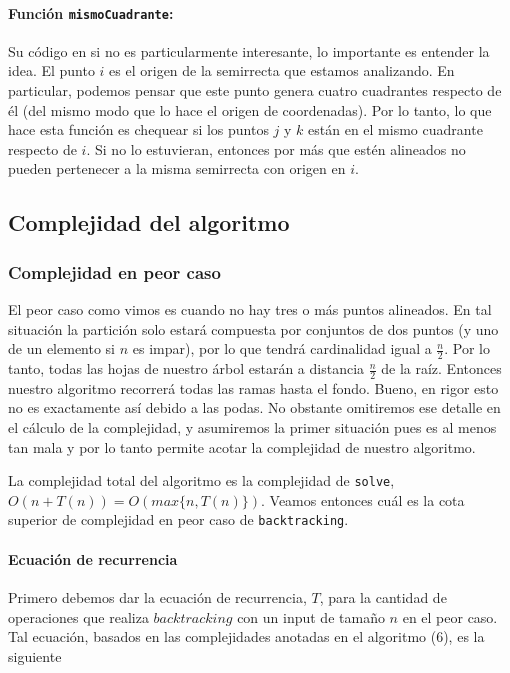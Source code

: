 
  \paragraph{Función \texttt{mismoCuadrante}:} Su código en si no es particularmente interesante, lo importante es entender la idea. El punto $i$ es el origen de la semirrecta que estamos analizando. En particular, podemos pensar que este punto genera cuatro cuadrantes respecto de él (del mismo modo que lo hace el origen de coordenadas). Por lo tanto, lo que hace esta función es chequear si los puntos $j$ y $k$ están en el mismo cuadrante respecto de $i$. Si no lo estuvieran, entonces por más que estén alineados no pueden pertenecer a la misma semirrecta con origen en $i$.

\subsection{Complejidad del algoritmo}
\subsubsection{Complejidad en peor caso}
El peor caso como vimos es cuando no hay tres o más puntos alineados. En tal situación la partición solo estará compuesta por conjuntos de dos puntos (y uno de un elemento si $n$ es impar), por lo que tendrá cardinalidad igual a $\frac{n}{2}$. Por lo tanto, todas las hojas de nuestro árbol estarán a distancia $\frac{n}{2}$ de la raíz. Entonces nuestro algoritmo recorrerá todas las ramas hasta el fondo. Bueno, en rigor esto no es exactamente así debido a las podas. No obstante omitiremos ese detalle en el cálculo de la complejidad, y asumiremos la primer situación pues es al menos tan mala y por lo tanto permite acotar la complejidad de nuestro algoritmo.

La complejidad total del algoritmo es la complejidad de \texttt{solve}, $O(n + T(n)) = O(max\{n, T(n)\})$. Veamos entonces cuál es la cota superior de complejidad en peor caso de \texttt{backtracking}. 

\paragraph{Ecuación de recurrencia}
Primero debemos dar la ecuación de recurrencia, $T$, para la cantidad de operaciones que realiza $backtracking$ con un input de tamaño $n$ en el peor caso. Tal ecuación, basados en las complejidades anotadas en el algoritmo (6), es la siguiente

